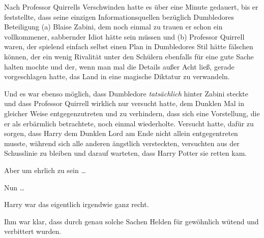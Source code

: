 Nach Professor Quirrells Verschwinden hatte es über eine Minute gedauert, bis er feststellte, dass seine einzigen Informationsquellen bezüglich Dumbledores Beteiligung (a) Blaise Zabini, dem noch einmal zu trauen er schon ein vollkommener, sabbernder Idiot hätte sein müssen und (b) Professor Quirrell waren, der spielend einfach selbst einen Plan in Dumbledores Stil hätte fälschen können, der ein wenig Rivalität unter den Schülern ebenfalls für eine gute Sache halten mochte und der, wenn man mal die Details außer Acht ließ, gerade vorgeschlagen hatte, das Land in eine magische Diktatur zu verwandeln.

Und es war ebenso möglich, dass Dumbledore \emph{tatsächlich} hinter Zabini steckte und dass Professor Quirrell wirklich nur versucht hatte, dem Dunklen Mal in gleicher Weise entgegenzutreten und zu verhindern, dass sich eine Vorstellung, die er als erbärmlich betrachtete, noch einmal wiederholte. Versucht hatte, dafür zu sorgen, dass Harry dem Dunklen Lord am Ende nicht allein entgegentreten musste, während sich alle anderen ängstlich versteckten, versuchten aus der Schusslinie zu bleiben und darauf warteten, dass Harry Potter sie retten kam.

Aber um ehrlich zu sein …

Nun …

Harry war das eigentlich irgendwie ganz recht.

Ihm war klar, dass durch genau solche Sachen Helden für gewöhnlich wütend und verbittert wurden.

